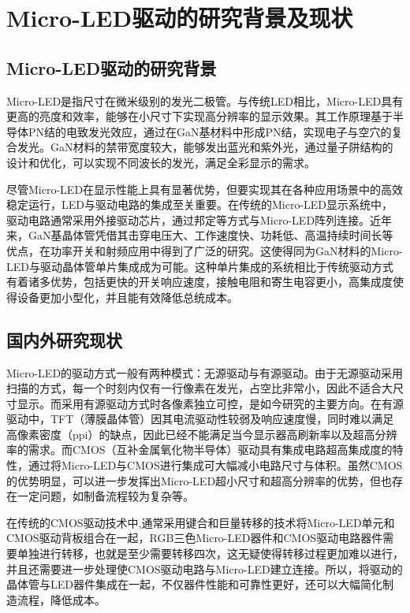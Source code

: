 \documentclass[
    oneside,                %
    fontset = win, %
  ]{njuthesis}
\begin{document}
\section{Micro-LED驱动的研究背景及现状}

\subsection{Micro-LED驱动的研究背景}

Micro-LED是指尺寸在微米级别的发光二极管。与传统LED相比，Micro-LED具有更高的亮度和效率，能够在小尺寸下实现高分辨率的显示效果。其工作原理基于半导体PN结的电致发光效应，通过在GaN基材料中形成PN结，实现电子与空穴的复合发光\cite{蒋府龙2020氮化镓基}。GaN材料的禁带宽度较大，能够发出蓝光和紫外光，通过量子阱结构的设计和优化，可以实现不同波长的发光，满足全彩显示的需求。

尽管Micro-LED在显示性能上具有显著优势，但要实现其在各种应用场景中的高效稳定运行，LED与驱动电路的集成至关重要。在传统的Micro-LED显示系统中，驱动电路通常采用外接驱动芯片，通过邦定等方式与Micro-LED阵列连接\cite{rahman2024tunnel}。近年来，GaN基晶体管凭借其击穿电压大、工作速度快、功耗低、高温持续时间长等优点，在功率开关和射频应用中得到了广泛的研究。这使得同为GaN材料的Micro-LED与驱动晶体管单片集成成为可能。这种单片集成的系统相比于传统驱动方式有着诸多优势，包括更快的开关响应速度，接触电阻和寄生电容更小，高集成度使得设备更加小型化，并且能有效降低总统成本\cite{lu2016monolithic}。

\subsection{国内外研究现状}

Micro-LED的驱动方式一般有两种模式：无源驱动与有源驱动。由于无源驱动采用扫描的方式，每一个时刻内仅有一行像素在发光，占空比非常小，因此不适合大尺寸显示。而采用有源驱动方式时各像素独立可控，是如今研究的主要方向\cite{周律2022micro}。在有源驱动中，TFT（薄膜晶体管）因其电流驱动性较弱及响应速度慢\cite{朱宇轩2024AM-MicroLED显示驱动技术}，同时难以满足高像素密度（ppi）的缺点，因此已经不能满足当今显示器高刷新率以及超高分辨率的需求。而CMOS（互补金属氧化物半导体）驱动具有集成电路超高集成度的特性，通过将Micro-LED与CMOS进行集成可大幅减小电路尺寸与体积。虽然CMOS的优势明显，可以进一步发挥出Micro-LED超小尺寸和超高分辨率的优势，但也存在一定问题，如制备流程较为复杂等\cite{steudel202438}。

在传统的CMOS驱动技术中,通常采用键合和巨量转移的技术将Micro-LED单元和CMOS驱动背板组合在一起，RGB三色Micro-LED器件和CMOS驱动电路器件需要单独进行转移，也就是至少需要转移四次，这无疑使得转移过程更加难以进行，并且还需要进一步处理使CMOS驱动电路与Micro-LED建立连接\cite{周律2022micro}。所以，将驱动的晶体管与LED器件集成在一起，不仅器件性能和可靠性更好，还可以大幅简化制造流程，降低成本。
\end{document}
